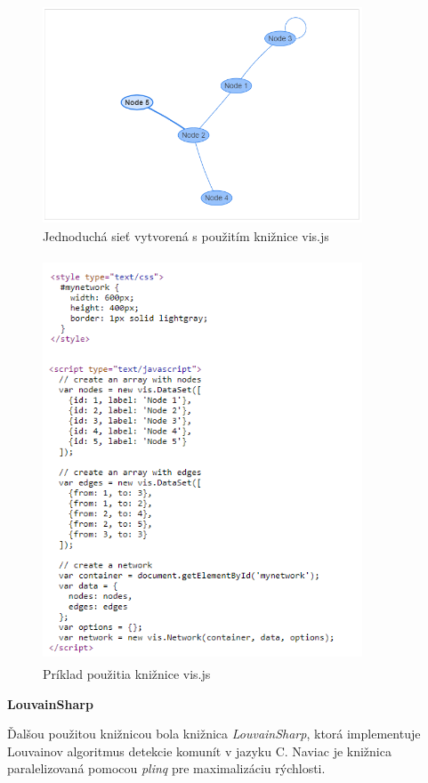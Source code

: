 \documentclass[slovak,master,public,dept460,male,cpdeclaration,oneside]{diploma}
\begin{document}
\begin{figure}[H]
\centering
\includegraphics[width=9.5cm, height=6.5cm]{figures/vis_basic_usage}
\caption{Jednoduchá sieť vytvorená s použitím knižnice vis.js}
\end{figure}


\begin{figure}[H]
\centering
\includegraphics[width=9.5cm, height=12cm]{figures/vis_basiccode}
\caption{Príklad použitia knižnice vis.js}
\end{figure}

\textbf{LouvainSharp}


Ďalšou použitou knižnicou bola knižnica \textit{LouvainSharp}, ktorá implementuje Louvainov algoritmus detekcie komunít v jazyku C. Naviac je knižnica paralelizovaná pomocou \textit{plinq} pre maximalizáciu rýchlosti. \cite{louvain}
\end{document}
